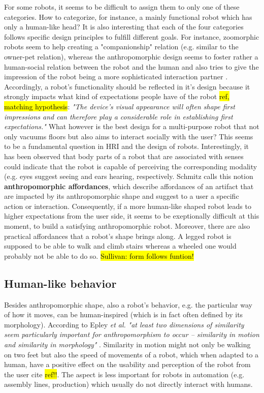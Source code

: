 \documentclass[lettersize, apacite, twoside, HRI]{apa_HRI}
\begin{document}
	For some robots, it seems to be difficult to assign them to only one of these categories. How to categorize, for instance, a mainly functional robot which has only a human-like head? It is also interesting that each of the four categories follows specific design principles to fulfill different goals. For instance, zoomorphic robots seem to help creating a "companionship" relation (e.g. similar to the owner-pet relation), whereas the anthropomorphic design seems to foster rather a human-social relation between the robot and the human and also tries to give the impression of the robot being a more sophisticated interaction partner \cite{disalvo_all_2002,fong_survey_2003,kiesler_mental_2002}. Accordingly, a robot's functionality should be reflected in it's design because it strongly impacts what kind of expectations people have of the robot \hl{ref, matching hypothesis}: \textit{"The device's visual appearance will often shape first impressions and can therefore play a considerable role in establishing first expectations."} \cite{schmitz_concepts_2011} What however is the best design for a multi-purpose robot that not only vacuums floors but also aims to interact socially with the user? This seems to be a fundamental question in HRI and the design of robots. Interestingly, it has been observed that body parts of a robot that are associated with senses could indicate that the robot is capable of perceiving the corresponding modality (e.g. eyes suggest seeing and ears hearing, respectively. \cite{schmitz_concepts_2011} Schmitz calls this notion \textbf{anthropomorphic affordances}, which describe affordances of an artifact that are impacted by its anthropomorphic shape and suggest to a user a  specific action or interaction. Consequently, if a more human-like shaped robot leads to higher expectations from the user side, it seems to be exeptionally difficult at this moment, to build a satisfying anthropomorphic robot. Moreover, there are also practical affordances that a robot's shape brings along. A legged robot is supposed to be able to walk and climb stairs whereas a wheeled one would probably not be able to do so. \hl{Sullivan: form follows funtion!}
	
\subsection{Human-like behavior}
\label{sec:4.2}

	Besides anthropomorphic shape, also a robot's behavior, e.g. the particular way of how it moves, can be human-inspired (which is in fact often defined by its morphology). According to Epley \textit{et al.} \textit{"at least two dimensions of similarity seem particularly important for anthropomorphism to occur -- similarity in motion and similarity in morphology"} \cite{epley_seeing_2007}. Similarity in motion might not only be walking on two feet but also the speed of movements of a robot, which when adapted to a human, have a positive effect on the usability and perception of the robot from the user cite \hl{ref!!}. The aspect is less important for robots in automation (e.g. assembly lines, production) which usually do not directly interact with humans.
	
\end{document}
